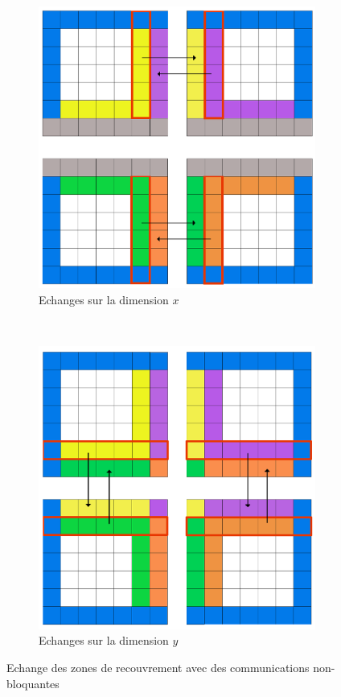 \begin{figure}[!ht]
  \centering
  \begin{subfigure}[b]{0.5\textwidth}
    \centering
    \includegraphics[scale=0.12]{figures/comm1.png}
    \caption{\label{fig:comm1}Echanges sur la dimension $x$}
  \end{subfigure}%
  ~
  \begin{subfigure}[b]{0.5\textwidth}
    \centering
    \includegraphics[scale=0.12]{figures/comm2.png}
    \caption{\label{fig:comm2}Echanges sur la dimension $y$}
  \end{subfigure}
  \caption{\label{fig:comm_synch}Echange des zones de recouvrement avec des communications non-bloquantes}
\end{figure}


